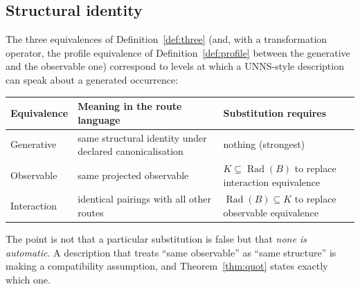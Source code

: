 \documentclass[11pt,a4paper]{article}
\newcommand{\Rad}{\operatorname{Rad}}
\theoremstyle{plain}
\theoremstyle{definition}
\begin{document}
\subsection{Structural identity}
The three equivalences of Definition~\ref{def:three} (and, with a transformation operator, the profile equivalence of Definition~\ref{def:profile} between the generative and the observable one) correspond to levels at which a UNNS-style description can speak about a generated occurrence:
\begin{center}\small
\begin{tabularx}{\textwidth}{@{}l>{\raggedright\arraybackslash}X>{\raggedright\arraybackslash}X@{}}
\toprule
Equivalence & Meaning in the route language & Substitution requires\\
\midrule
Generative & same structural identity under declared canonicalisation & nothing (strongest)\\
Observable & same projected observable & $K\subseteq\Rad(B)$ to replace interaction equivalence\\
Interaction & identical pairings with all other routes & $\Rad(B)\subseteq K$ to replace observable equivalence\\
\bottomrule
\end{tabularx}
\end{center}
The point is not that a particular substitution is false but that \emph{none is automatic}. A description that treats ``same observable'' as ``same structure'' is making a compatibility assumption, and Theorem~\ref{thm:quot} states exactly which one.
\end{document}

